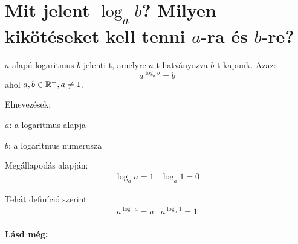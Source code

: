 
\section{Mit jelent \texorpdfstring{$\log_{a}b$}{log\textunderscore{}a(b)}? 
Milyen kikötéseket kell tenni \texorpdfstring{$a$}{a}-ra és
\texorpdfstring{$b$}{b}-re?}

\begin{defin}[Logaritmus]
$a$ alapú logaritmus $b$ jelenti t, amelyre $a$-t
hatványozva $b$-t kapunk. Azaz:
\[
  a^{\log_{a}b} = b
\]
ahol $a, b \in \mathbb{R}^+, a \neq 1$.

Elnevezések:

$a$: a logaritmus alapja

$b$: a logaritmus numerusza
\end{defin}

Megállapodás alapján:
\[
  \begin{array}{lr}
    \log_{a}a = 1 & \log_{a}1 = 0
  \end{array}
\]

Tehát definíció szerint:
\[
  \begin{array}{lr}
    a^{\log_{a}a} = a & a^{\log_{a}1} = 1\\
  \end{array}
\]

\textbf{Lásd még:} 
